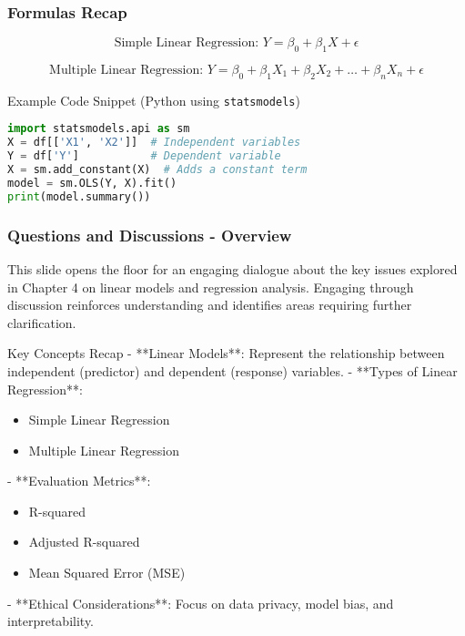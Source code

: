 \documentclass[aspectratio=169]{beamer}
\begin{document}
\begin{frame}[fragile]
    \frametitle{Formulas Recap}
    \begin{equation}
        \text{Simple Linear Regression: } Y = \beta_0 + \beta_1 X + \epsilon
    \end{equation}

    \begin{equation}
        \text{Multiple Linear Regression: } Y = \beta_0 + \beta_1 X_1 + \beta_2 X_2 + \ldots + \beta_n X_n + \epsilon
    \end{equation}
    
    \begin{block}{Example Code Snippet (Python using \texttt{statsmodels})}
    \begin{lstlisting}[language=Python]
import statsmodels.api as sm
X = df[['X1', 'X2']]  # Independent variables
Y = df['Y']           # Dependent variable
X = sm.add_constant(X)  # Adds a constant term
model = sm.OLS(Y, X).fit()
print(model.summary())
    \end{lstlisting}
    \end{block}
\end{frame}

\begin{frame}[fragile]
    \frametitle{Questions and Discussions - Overview}
    This slide opens the floor for an engaging dialogue about the key issues explored in Chapter 4 on linear models and regression analysis. 
    Engaging through discussion reinforces understanding and identifies areas requiring further clarification.

    \begin{block}{Key Concepts Recap}
        - **Linear Models**: Represent the relationship between independent (predictor) and dependent (response) variables.
        - **Types of Linear Regression**:
            \begin{itemize}
                \item Simple Linear Regression
                \item Multiple Linear Regression
            \end{itemize}
        - **Evaluation Metrics**:
            \begin{itemize}
                \item R-squared
                \item Adjusted R-squared
                \item Mean Squared Error (MSE)
            \end{itemize}
        - **Ethical Considerations**: Focus on data privacy, model bias, and interpretability.
    \end{block}
\end{frame}
\end{document}
